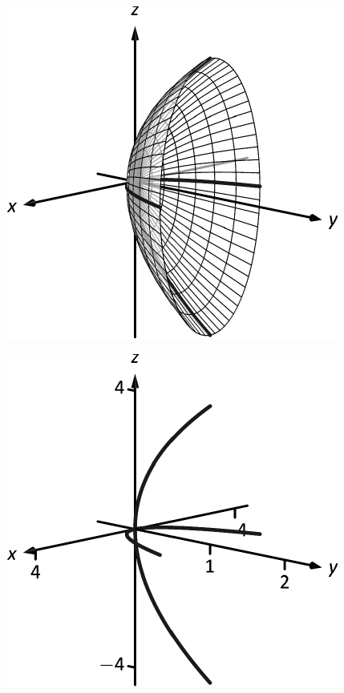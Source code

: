 \documentclass[10pt]{article}
\begin{document}
\includegraphics{figspace5a_3DBW.pdf}
\texttt{}

\includegraphics{figspace5ab_3DBW.pdf}
\texttt{}
\end{document}
